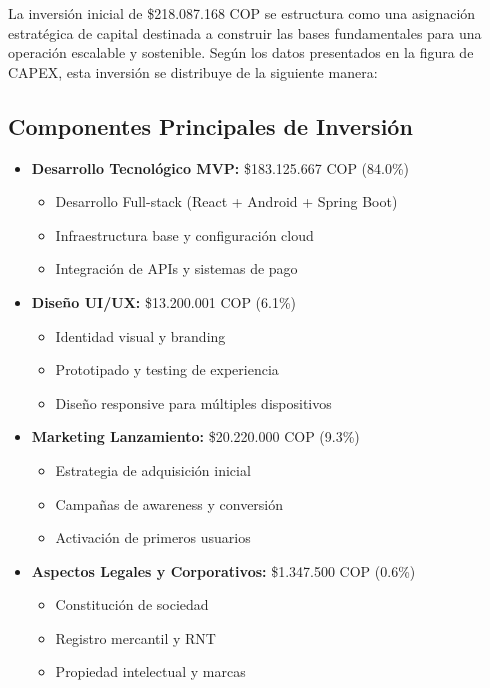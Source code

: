 \documentclass[12pt]{article}
\begin{document}
La inversión inicial de \$218.087.168 COP se estructura como una asignación estratégica de capital destinada a construir las bases fundamentales para una operación escalable y sostenible. Según los datos presentados en la figura de CAPEX, esta inversión se distribuye de la siguiente manera:

\subsection{Componentes Principales de Inversión}

\begin{itemize}
    \item \textbf{Desarrollo Tecnológico MVP:} \$183.125.667 COP (84.0\%)
    \begin{itemize}
        \item Desarrollo Full-stack (React + Android + Spring Boot)
        \item Infraestructura base y configuración cloud
        \item Integración de APIs y sistemas de pago
    \end{itemize}
    
    \item \textbf{Diseño UI/UX:} \$13.200.001 COP (6.1\%)
    \begin{itemize}
        \item Identidad visual y branding
        \item Prototipado y testing de experiencia
        \item Diseño responsive para múltiples dispositivos
    \end{itemize}
    
    \item \textbf{Marketing Lanzamiento:} \$20.220.000 COP (9.3\%)
    \begin{itemize}
        \item Estrategia de adquisición inicial
        \item Campañas de awareness y conversión
        \item Activación de primeros usuarios
    \end{itemize}
    
    \item \textbf{Aspectos Legales y Corporativos:} \$1.347.500 COP (0.6\%)
    \begin{itemize}
        \item Constitución de sociedad
        \item Registro mercantil y RNT
        \item Propiedad intelectual y marcas
    \end{itemize}
\end{itemize}
\end{document}

